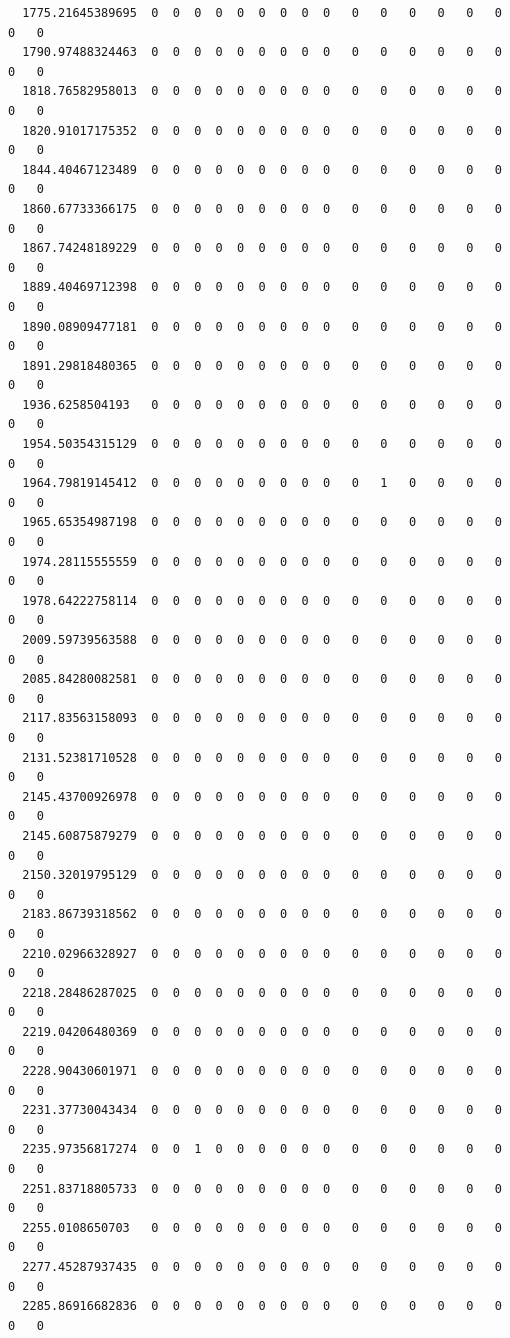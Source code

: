 \documentclass[
  letterpaper,
  DIV=11,
  numbers=noendperiod]{scrartcl}
\begin{document}
\begin{verbatim}
  1775.21645389695  0  0  0  0  0  0  0  0  0   0   0   0   0   0   0   0   0
  1790.97488324463  0  0  0  0  0  0  0  0  0   0   0   0   0   0   0   0   0
  1818.76582958013  0  0  0  0  0  0  0  0  0   0   0   0   0   0   0   0   0
  1820.91017175352  0  0  0  0  0  0  0  0  0   0   0   0   0   0   0   0   0
  1844.40467123489  0  0  0  0  0  0  0  0  0   0   0   0   0   0   0   0   0
  1860.67733366175  0  0  0  0  0  0  0  0  0   0   0   0   0   0   0   0   0
  1867.74248189229  0  0  0  0  0  0  0  0  0   0   0   0   0   0   0   0   0
  1889.40469712398  0  0  0  0  0  0  0  0  0   0   0   0   0   0   0   0   0
  1890.08909477181  0  0  0  0  0  0  0  0  0   0   0   0   0   0   0   0   0
  1891.29818480365  0  0  0  0  0  0  0  0  0   0   0   0   0   0   0   0   0
  1936.6258504193   0  0  0  0  0  0  0  0  0   0   0   0   0   0   0   0   0
  1954.50354315129  0  0  0  0  0  0  0  0  0   0   0   0   0   0   0   0   0
  1964.79819145412  0  0  0  0  0  0  0  0  0   0   1   0   0   0   0   0   0
  1965.65354987198  0  0  0  0  0  0  0  0  0   0   0   0   0   0   0   0   0
  1974.28115555559  0  0  0  0  0  0  0  0  0   0   0   0   0   0   0   0   0
  1978.64222758114  0  0  0  0  0  0  0  0  0   0   0   0   0   0   0   0   0
  2009.59739563588  0  0  0  0  0  0  0  0  0   0   0   0   0   0   0   0   0
  2085.84280082581  0  0  0  0  0  0  0  0  0   0   0   0   0   0   0   0   0
  2117.83563158093  0  0  0  0  0  0  0  0  0   0   0   0   0   0   0   0   0
  2131.52381710528  0  0  0  0  0  0  0  0  0   0   0   0   0   0   0   0   0
  2145.43700926978  0  0  0  0  0  0  0  0  0   0   0   0   0   0   0   0   0
  2145.60875879279  0  0  0  0  0  0  0  0  0   0   0   0   0   0   0   0   0
  2150.32019795129  0  0  0  0  0  0  0  0  0   0   0   0   0   0   0   0   0
  2183.86739318562  0  0  0  0  0  0  0  0  0   0   0   0   0   0   0   0   0
  2210.02966328927  0  0  0  0  0  0  0  0  0   0   0   0   0   0   0   0   0
  2218.28486287025  0  0  0  0  0  0  0  0  0   0   0   0   0   0   0   0   0
  2219.04206480369  0  0  0  0  0  0  0  0  0   0   0   0   0   0   0   0   0
  2228.90430601971  0  0  0  0  0  0  0  0  0   0   0   0   0   0   0   0   0
  2231.37730043434  0  0  0  0  0  0  0  0  0   0   0   0   0   0   0   0   0
  2235.97356817274  0  0  1  0  0  0  0  0  0   0   0   0   0   0   0   0   0
  2251.83718805733  0  0  0  0  0  0  0  0  0   0   0   0   0   0   0   0   0
  2255.0108650703   0  0  0  0  0  0  0  0  0   0   0   0   0   0   0   0   0
  2277.45287937435  0  0  0  0  0  0  0  0  0   0   0   0   0   0   0   0   0
  2285.86916682836  0  0  0  0  0  0  0  0  0   0   0   0   0   0   0   0   0

\end{verbatim}
\end{document}
